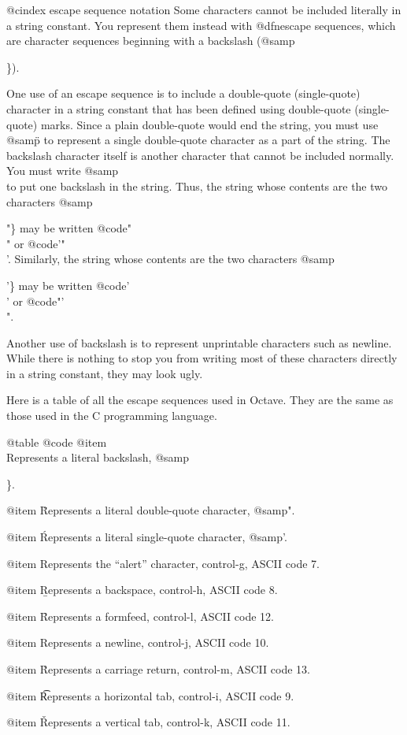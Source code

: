 @cindex escape sequence notation
Some characters cannot be included literally in a string constant.  You
represent them instead with @dfn{escape sequences}, which are character
sequences beginning with a backslash (@samp{\}).

One use of an escape sequence is to include a double-quote
(single-quote) character in a string constant that has been defined
using double-quote (single-quote) marks.  Since a plain double-quote
would end the string, you must use @samp{\"} to represent a single
double-quote character as a part of the string.  The backslash character
itself is another character that cannot be included normally.  You must
write @samp{\\} to put one backslash in the string.  Thus, the string
whose contents are the two characters @samp{"\} may be written
@code{"\"\\"} or @code{'"\\'}.  Similarly, the string whose contents are
the two characters @samp{'\} may be written @code{'\'\\'} or @code{"'\\"}.

Another use of backslash is to represent unprintable characters
such as newline.  While there is nothing to stop you from writing most
of these characters directly in a string constant, they may look ugly.

Here is a table of all the escape sequences used in Octave.  They are
the same as those used in the C programming language.

@table @code
@item \\
Represents a literal backslash, @samp{\}.

@item \"
Represents a literal double-quote character, @samp{"}.

@item \'
Represents a literal single-quote character, @samp{'}.

@item \a
Represents the ``alert'' character, control-g, ASCII code 7.

@item \b
Represents a backspace, control-h, ASCII code 8.

@item \f
Represents a formfeed, control-l, ASCII code 12.

@item \n
Represents a newline, control-j, ASCII code 10.

@item \r
Represents a carriage return, control-m, ASCII code 13.

@item \t
Represents a horizontal tab, control-i, ASCII code 9.

@item \v
Represents a vertical tab, control-k, ASCII code 11.

}}}}
